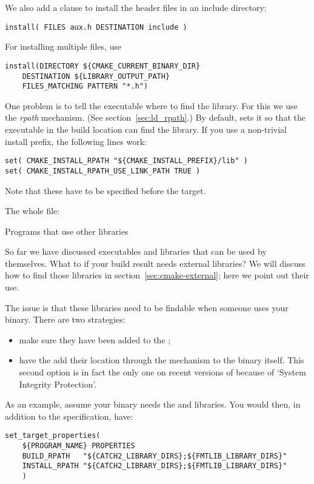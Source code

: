 We also add a clause to install the header files in an include directory:
\begin{lstlisting}
install( FILES aux.h DESTINATION include )
\end{lstlisting}
For installing multiple files, use
\begin{lstlisting}
install(DIRECTORY ${CMAKE_CURRENT_BINARY_DIR}
    DESTINATION ${LIBRARY_OUTPUT_PATH}
    FILES_MATCHING PATTERN "*.h")
\end{lstlisting}

One problem is to tell the executable where to find the library.
For this we use the
\emph{rpath}
mechanism.
(See section~\ref{sec:ld_rpath}.)
By default,  sets it so that the executable in the build location
can find the library.
If you use a non-trivial install prefix, the following lines work:
\begin{lstlisting}
set( CMAKE_INSTALL_RPATH "${CMAKE_INSTALL_PREFIX}/lib" )
set( CMAKE_INSTALL_RPATH_USE_LINK_PATH TRUE )
\end{lstlisting}
Note that these have to be specified before the target.

The whole file:
%


\newpage
{} {Programs that use other libraries}

So far we have discussed executables and libraries that can be used by themselves.
What to if your build result needs external libraries?
We will discuss how to find those libraries in section~\ref{sec:cmake-external};
here we point out their use.

The issue is that these libraries need to be findable
when someone uses your binary. There are two strategies:
\begin{itemize}
\item make sure they have been added to the ;
\item have the  add their location through the 
  mechanism to the binary itself.
  This second option is in fact the only one on recent versions of
   because of `System Integrity Protection'.
\end{itemize}

As an example, assume your binary needs the 
and  libraries.
You would then,
in addition to the  specification,
have:
\begin{lstlisting}
set_target_properties(
	${PROGRAM_NAME} PROPERTIES
	BUILD_RPATH   "${CATCH2_LIBRARY_DIRS};${FMTLIB_LIBRARY_DIRS}"
	INSTALL_RPATH "${CATCH2_LIBRARY_DIRS};${FMTLIB_LIBRARY_DIRS}"
    )
\end{lstlisting}

